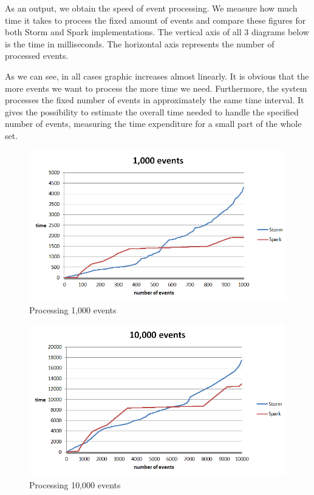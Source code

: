 As an output, we obtain the speed of event processing.
We measure how much time it takes to process the fixed amount of events and compare these figures for both Storm and Spark implementations.
The vertical axis of all 3 diagrams below is the time in milliseconds.
The horizontal axis represents the number of processed events.

As we can see, in all cases graphic increases almost linearly.
It is obvious that the more events we want to process the more time we need.
Furthermore, the system processes the fixed number of events in approximately the same time interval.
It gives the possibility to estimate the overall time needed to handle the specified number of events, measuring the time expenditure for a small part of the whole set.

\begin{figure}
  \centering
  \includegraphics [width=1.0\textwidth]{images/exp1}
  \caption{Processing 1,000 events}
  \label{fig:1000events}
\end{figure}

\begin{figure}
  \centering
  \includegraphics [width=1.0\textwidth]{images/exp2}
  \caption{Processing 10,000 events}
  \label{fig:10000events}
\end{figure}

